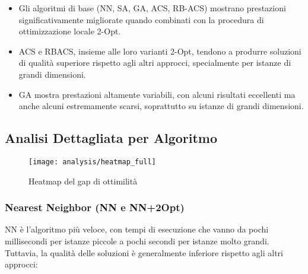 \begin{itemize}
	\item Gli algoritmi di base (NN, SA, GA, ACS, RB-ACS) mostrano prestazioni significativamente migliorate quando combinati con la procedura di ottimizzazione locale 2-Opt.
	\item ACS e RBACS, insieme alle loro varianti 2-Opt, tendono a produrre soluzioni di qualità superiore rispetto agli altri approcci, specialmente per istanze di grandi dimensioni.
	\item GA mostra prestazioni altamente variabili, con alcuni risultati eccellenti ma anche alcuni estremamente scarsi, soprattutto su istanze di grandi dimensioni.
\end{itemize}

\subsection{Analisi Dettagliata per Algoritmo}


\begin{figure}
	\begin{center}
		\texttt{[image: analysis/heatmap\_full]}
	\end{center}
	\caption{Heatmap del gap di ottimilità}\label{fig:heatmap_full}
\end{figure}

\subsubsection{Nearest Neighbor (NN e NN+2Opt)}
NN è l'algoritmo più veloce, con tempi di esecuzione che vanno da pochi millisecondi per istanze piccole a pochi secondi per istanze molto grandi. Tuttavia, la qualità delle soluzioni è generalmente inferiore rispetto agli altri approcci:

